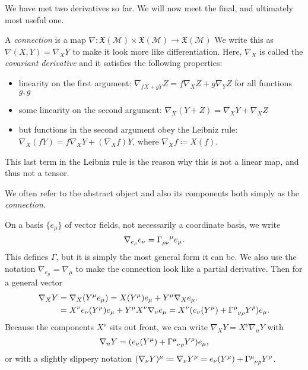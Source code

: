 We have met two derivatives so far. We will now meet the final, and ultimately most useful one.

\begin{definition}
  A \emph{connection} is a map $\nabla \colon \mathfrak{X}(\mathcal{M}) \times \mathfrak{X}(\mathcal{M}) \to \mathfrak{X}(\mathcal{M})$
  We write this as $\nabla(X, Y) = \nabla_X Y$ to make it look more like differentiation.
  Here, $\nabla_X$ is called the \emph{covariant derivative} and it satisfies the following properties:
  \begin{itemize}
    \item linearity on the first argument: $\nabla_{fX + gY} Z = f\nabla_X Z + g \nabla_Y Z $ for all functions $g, g$
    \item some linearity on the second argument: $\nabla_X (Y + Z) = \nabla_X Y + \nabla_X Z$
    \item but functions in the second argument obey the Leibniz rule: $\nabla_X (f Y) = f\nabla_X Y + (\nabla_X f) Y$, where $\nabla_X f \coloneqq X(f)$.
  \end{itemize}
\end{definition}
\begin{leftbar}
  \begin{remark}
    This last term in the Leibniz rule is the reason why this is not a linear map, and thus not a tensor.
  \end{remark}
\end{leftbar}
\begin{leftbar}
  \begin{remark}
    We often refer to the abstract object and also its components both simply as the \emph{connection}.
  \end{remark}
\end{leftbar}
On a basis $\{ e_\mu\}$ of vector fields, not necessarily a coordinate basis, we write
\begin{equation}
  \nabla_{e_\rho} e_\nu = \Gamma \indices{_{\rho\nu}^{\mu}} e_{\mu}.
\end{equation}
This defines $\Gamma$, but it is simply the most general form it can be.
We also use the notation $\nabla_{e_\mu} = \nabla_\mu$ to make the connection look like a partial derivative.
Then for a general vector
\begin{align}
  \nabla_X Y &= \nabla_X (Y^\mu e_\mu) = X (Y^\mu) e_\mu + Y^\mu \nabla_X e_\mu. \\
	     &= X^\nu e_\nu (Y^\mu) e_\mu + Y^\mu X^\nu \nabla_\nu e_\mu = X^\nu (e_\nu (Y^\mu) + \Gamma \indices{^\mu_\nu_\rho} Y^\rho) e_\mu.
\end{align}
Because the components $X^\nu$ sits out front, we can write $\nabla_X Y = X^\nu \nabla_n Y$ with 
\begin{equation}
  \nabla_n Y = (e_\nu (Y^\mu) + \Gamma \indices{^\mu_{\nu\rho}} Y^\rho) e_\mu,
\end{equation}
or with a slightly slippery notation $(\nabla_\nu Y)^\mu \coloneqq \nabla_\nu Y^\mu = e_\nu (Y^\mu) + \Gamma \indices{^\mu_\nu_\rho} Y^\rho$.

